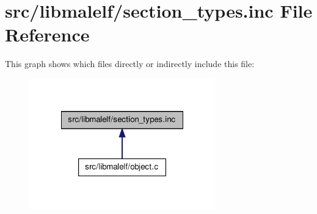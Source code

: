 \hypertarget{section__types_8inc}{
\section{src/libmalelf/section\_\-types.inc File Reference}
\label{section__types_8inc}
}
This graph shows which files directly or indirectly include this file:\nopagebreak
\begin{figure}[H]
\begin{center}
\leavevmode
\includegraphics[width=228pt]{section__types_8inc__dep__incl}
\end{center}
\end{figure}
